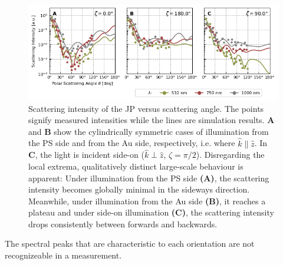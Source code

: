 \documentclass[10pt]{article}
\newcommand{\reffig}[2]{\mbox{\sffamily{Figure \ref{#1}#2}}}
\begin{document}
\begin{figure}[t!]
    \centering
    \includegraphics[width=\textwidth]{[fig] cartesian mieplots (3, placeholder)}
    \caption{Scattering intensity of the JP versus scattering angle. 
    The points signify measured intensities while the lines are simulation results.  
    {\sffamily\bfseries A} and {\sffamily\bfseries B} show the cylindrically symmetric cases of illumination from the PS side and from the Au side, respectively, i.e. where $\hat{k}\parallel\hat{z}$. 
    In {\sffamily\bfseries C}, the light is incident side-on ($\hat{k}\perp\hat{z}$, $\zeta=\pi/2$). 
    Disregarding the local extrema, qualitatively distinct large-scale behaviour is apparent: Under illumination from the PS side {\sffamily\bfseries (A)}, the scattering intensity becomes globally minimal in the sideways direction. 
    Meanwhile, under illumination from the Au side {\sffamily\bfseries (B)}, it reaches a plateau and under side-on illumination {\sffamily\bfseries (C)}, the scattering intensity drops consistently between forwards and backwards.  
    }
    \label{fig:jp-mieplots-oneline}
\end{figure}

The spectral peaks that are characteristic to each orientation are not recognizeable in a measurement. 



\end{document}
